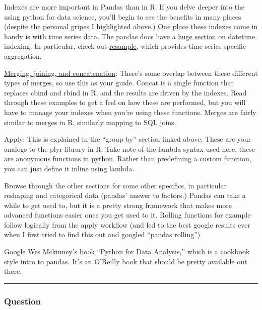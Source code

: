\documentclass[11pt]{article}
\begin{document}
Indexes are more important in Pandas than in R. If you delve deeper into
the using python for data science, you'll begin to see the benefits in
many places (despite the personal gripes I highlighted above.) One place
these indexes come in handy is with time series data. The pandas docs
have a
\href{http://pandas.pydata.org/pandas-docs/stable/timeseries.html}{huge
section} on datetime indexing. In particular, check out
\href{https://pandas.pydata.org/pandas-docs/stable/generated/pandas.DataFrame.resample.html}{resample},
which provides time series specific aggregation.

\href{https://pandas.pydata.org/pandas-docs/stable/merging.html}{Merging,
joining, and concatenation}: There's some overlap between these
different types of merges, so use this as your guide. Concat is a single
function that replaces cbind and rbind in R, and the results are driven
by the indexes. Read through these examples to get a feel on how these
are performed, but you will have to manage your indexes when you're
using these functions. Merges are fairly similar to merges in R,
similarly mapping to SQL joins.

Apply: This is explained in the ``group by'' section linked above. These
are your analogs to the plyr library in R. Take note of the lambda
syntax used here, these are anonymous functions in python. Rather than
predefining a custom function, you can just define it inline using
lambda.

Browse through the other sections for some other specifics, in
particular reshaping and categorical data (pandas' answer to factors.)
Pandas can take a while to get used to, but it is a pretty strong
framework that makes more advanced functions easier once you get used to
it. Rolling functions for example follow logically from the apply
workflow (and led to the best google results ever when I first tried to
find this out and googled ``pandas rolling'')

Google Wes Mckinney's book ``Python for Data Analysis,'' which is a
cookbook style intro to pandas. It's an O'Reilly book that should be
pretty available out there.

\begin{center}\rule{0.5\linewidth}{0.5pt}\end{center}

\hypertarget{question}{%
\subsubsection{Question}\label{question}}
\end{document}
